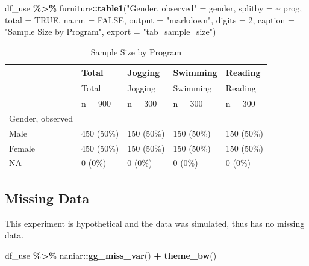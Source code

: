 \documentclass[
]{article}
\newenvironment{Shaded}{\begin{snugshade}}{\end{snugshade}}
\newcommand{\AttributeTok}[1]{\textcolor[rgb]{0.13,0.29,0.53}{#1}}
\newcommand{\ConstantTok}[1]{\textcolor[rgb]{0.56,0.35,0.01}{#1}}
\newcommand{\DecValTok}[1]{\textcolor[rgb]{0.00,0.00,0.81}{#1}}
\newcommand{\FunctionTok}[1]{\textcolor[rgb]{0.13,0.29,0.53}{\textbf{#1}}}
\newcommand{\NormalTok}[1]{#1}
\newcommand{\OtherTok}[1]{\textcolor[rgb]{0.56,0.35,0.01}{#1}}
\newcommand{\SpecialCharTok}[1]{\textcolor[rgb]{0.81,0.36,0.00}{\textbf{#1}}}
\newcommand{\StringTok}[1]{\textcolor[rgb]{0.31,0.60,0.02}{#1}}
\begin{document}
\begin{Shaded}
\begin{Highlighting}[]
\NormalTok{df\_use }\SpecialCharTok{\%\textgreater{}\%} 
\NormalTok{  furniture}\SpecialCharTok{::}\FunctionTok{table1}\NormalTok{(}\StringTok{"Gender, observed"} \OtherTok{=}\NormalTok{ gender,}
                    \AttributeTok{splitby =} \SpecialCharTok{\textasciitilde{}}\NormalTok{ prog,}
                    \AttributeTok{total =} \ConstantTok{TRUE}\NormalTok{,}
                    \AttributeTok{na.rm =} \ConstantTok{FALSE}\NormalTok{,}
                    \AttributeTok{output =} \StringTok{"markdown"}\NormalTok{,}
                    \AttributeTok{digits =} \DecValTok{2}\NormalTok{,}
                    \AttributeTok{caption =} \StringTok{"Sample Size by Program"}\NormalTok{,}
                    \AttributeTok{export =} \StringTok{"tab\_sample\_size"}\NormalTok{)}
\end{Highlighting}
\end{Shaded}

\begin{longtable}[]{@{}lllll@{}}
\caption{Sample Size by Program}\tabularnewline
\toprule\noalign{}
& Total & Jogging & Swimming & Reading \\
\midrule\noalign{}
\endfirsthead
\toprule\noalign{}
& Total & Jogging & Swimming & Reading \\
\midrule\noalign{}
\endhead
\bottomrule\noalign{}
\endlastfoot
& n = 900 & n = 300 & n = 300 & n = 300 \\
Gender, observed & & & & \\
Male & 450 (50\%) & 150 (50\%) & 150 (50\%) & 150 (50\%) \\
Female & 450 (50\%) & 150 (50\%) & 150 (50\%) & 150 (50\%) \\
NA & 0 (0\%) & 0 (0\%) & 0 (0\%) & 0 (0\%) \\
\end{longtable}

\clearpage

\hypertarget{missing-data}{%
\subsection{Missing Data}\label{missing-data}}

This experiment is hypothetical and the data was simulated, thus has no
missing data.

\begin{Shaded}
\begin{Highlighting}[]
\NormalTok{df\_use }\SpecialCharTok{\%\textgreater{}\%} 
\NormalTok{  naniar}\SpecialCharTok{::}\FunctionTok{gg\_miss\_var}\NormalTok{() }\SpecialCharTok{+}
  \FunctionTok{theme\_bw}\NormalTok{()}
\end{Highlighting}
\end{Shaded}
\end{document}
